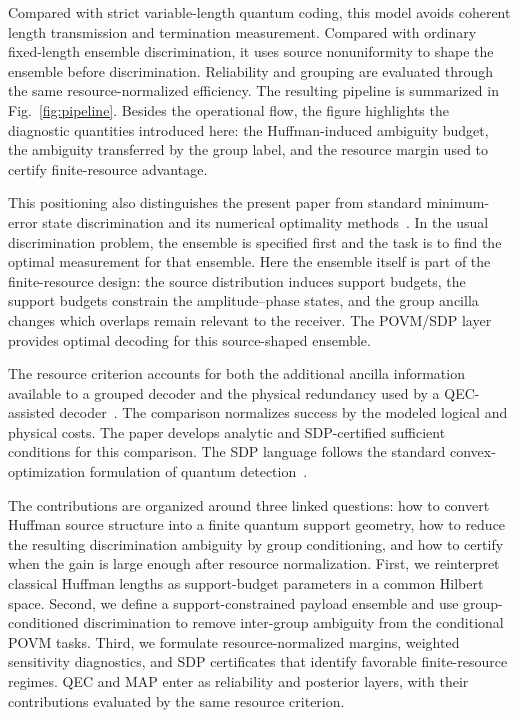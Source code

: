 \documentclass[
 reprint,
 amsmath,amssymb,
 aps,
 pra,
 floatfix,
]{revtex4-2}
\begin{document}
Compared with strict variable-length quantum coding, this model avoids coherent length transmission and termination measurement. Compared with ordinary fixed-length ensemble discrimination, it uses source nonuniformity to shape the ensemble before discrimination. Reliability and grouping are evaluated through the same resource-normalized efficiency. The resulting pipeline is summarized in Fig.~\ref{fig:pipeline}. Besides the operational flow, the figure highlights the diagnostic quantities introduced here: the Huffman-induced ambiguity budget, the ambiguity transferred by the group label, and the resource margin used to certify finite-resource advantage.

This positioning also distinguishes the present paper from standard minimum-error state discrimination and its numerical optimality methods~\cite{helstrom1969quantum,helstrom1976quantum,holevo1973statistical,yuen1975optimum,belavkin1975optimum,chefles2000quantum,barnett2009quantum,bae2015quantum,jezek2002finding}. In the usual discrimination problem, the ensemble is specified first and the task is to find the optimal measurement for that ensemble. Here the ensemble itself is part of the finite-resource design: the source distribution induces support budgets, the support budgets constrain the amplitude--phase states, and the group ancilla changes which overlaps remain relevant to the receiver. The POVM/SDP layer provides optimal decoding for this source-shaped ensemble.

The resource criterion accounts for both the additional ancilla information available to a grouped decoder and the physical redundancy used by a QEC-assisted decoder~\cite{shor1995scheme,steane1996error,calderbank1996good,knill1997theory,gottesman1997stabilizer,nielsen2010quantum,lidar2013quantum,terhal2015quantum}. The comparison normalizes success by the modeled logical and physical costs. The paper develops analytic and SDP-certified sufficient conditions for this comparison. The SDP language follows the standard convex-optimization formulation of quantum detection~\cite{eldar2003designing,jezek2002finding,boyd2004convex,watrous2018theory}.

The contributions are organized around three linked questions: how to convert Huffman source structure into a finite quantum support geometry, how to reduce the resulting discrimination ambiguity by group conditioning, and how to certify when the gain is large enough after resource normalization. First, we reinterpret classical Huffman lengths as support-budget parameters in a common Hilbert space. Second, we define a support-constrained payload ensemble and use group-conditioned discrimination to remove inter-group ambiguity from the conditional POVM tasks. Third, we formulate resource-normalized margins, weighted sensitivity diagnostics, and SDP certificates that identify favorable finite-resource regimes. QEC and MAP enter as reliability and posterior layers, with their contributions evaluated by the same resource criterion.
\end{document}
